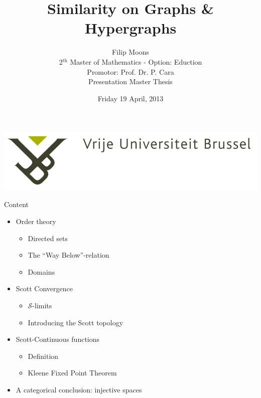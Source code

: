 \documentclass{beamer}
\title{Similarity on Graphs \& Hypergraphs}
\author{Filip Moons\\2$^{\text{th}}$ Master of Mathematics - Option: Eduction\\Promotor: Prof. Dr. P. Cara\\Presentation Master Thesis}
\date{Friday 19 April, 2013}
\begin{document}
\begin{frame}[plain]
\includegraphics[width=0.4\paperwidth]{VUB_logo.jpg}
\vspace{2cm}
\titlepage
\end{frame}



%
%
%
%

\begin{frame}{Content}
\begin{itemize}
  \item Order theory
    \begin{itemize}
        \item Directed sets
        \item The ``Way Below''-relation
        \item Domains
    \end{itemize}
  \item Scott Convergence
    \begin{itemize}
        \item $\mathcal{S}$-limits
        \item Introducing the Scott topology
    \end{itemize}

  \item Scott-Continuous functions
   \begin{itemize}
        \item Definition
        \item Kleene Fixed Point Theorem
    \end{itemize}
  \item A categorical conclusion: injective spaces
\end{itemize}

\end{frame}
\end{document}
